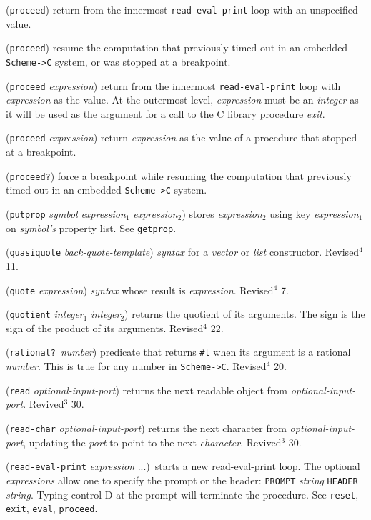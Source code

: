 \documentclass[10pt,twocolumn]{article}
\begin{document}
(\texttt{proceed}) return from the innermost \texttt{read-eval-print} loop with
an unspecified value.

(\texttt{proceed}) resume the computation that previously timed out in an
embedded \texttt{Scheme->C} system, or was stopped at a breakpoint.

(\texttt{proceed} \emph{expression})  return from the innermost
\texttt{read-eval-print} loop with \emph{expression} as the value.  At the
outermost level, \emph{expression} must be an \emph{integer} as it will be
used as the argument for a call to the C library procedure
\emph{exit}.

(\texttt{proceed} \emph{expression})  return \emph{expression} as the value of a
procedure that stopped at a breakpoint.

(\texttt{proceed?}) force a breakpoint while resuming the computation that
previously timed out in an embedded \texttt{Scheme->C} system.

(\texttt{putprop} \emph{symbol} \emph{expression}$_1$ \emph{expression}$_2$)
stores \emph{expression}$_2$ using key \emph{expression}$_1$ on
\emph{symbol's} property list.  See \texttt{getprop}.

(\texttt{quasiquote} \emph{back-quote-template}) \emph{syntax} for a \emph{vector}
or \emph{list} constructor.  Revised$^4$ 11.

(\texttt{quote} \emph{expression}) \emph{syntax} whose result is \emph{expression}.
Revised$^4$ 7.

(\texttt{quotient} \emph{integer}$_1$ \emph{integer}$_2$) returns the quotient
of its arguments.  The sign is the sign of the product of its
arguments. Revised$^4$ 22.

(\texttt{rational?}\ \emph{number}) predicate that returns \texttt{\#t} when
its argument is a rational \emph{number}.  This is true for any
number in \texttt{Scheme->C}.  Revised$^4$ 20.

(\texttt{read} \emph{optional-input-port}) returns the next readable object
from \emph{optional-input-port}.  Revived$^3$ 30.

(\texttt{read-char} \emph{optional-input-port}) returns the next character
from \emph{optional-input-port}, updating the \emph{port} to point to the
next \emph{character}.  Revived$^3$ 30.

(\texttt{read-eval-print} \emph{expression} ...)\ starts  a new
read-eval-print loop.  The optional \emph{expressions} allow one to
specify the prompt or the header:  \texttt{PROMPT} \emph{string} \texttt{HEADER}
\emph{string}.  Typing control-D at the prompt will terminate the
procedure.  See \texttt{reset}, \texttt{exit}, \texttt{eval}, \texttt{proceed}.
\end{document}
